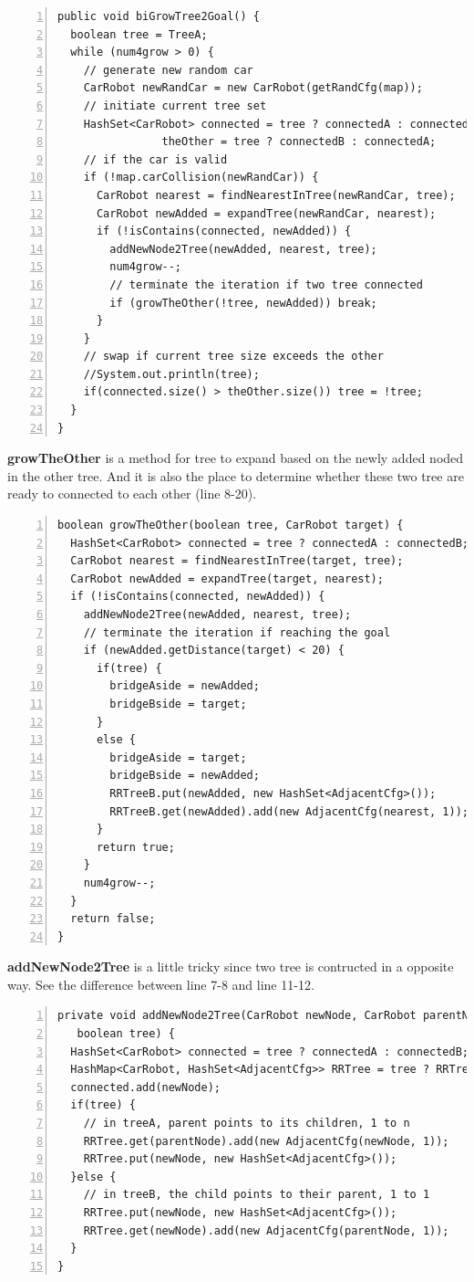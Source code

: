 \documentclass{article}
\begin{document}
\begin{lstlisting}[numbers=left]
public void biGrowTree2Goal() {
  boolean tree = TreeA;
  while (num4grow > 0) {
    // generate new random car
    CarRobot newRandCar = new CarRobot(getRandCfg(map));
    // initiate current tree set
    HashSet<CarRobot> connected = tree ? connectedA : connectedB,
                theOther = tree ? connectedB : connectedA;
    // if the car is valid
    if (!map.carCollision(newRandCar)) {
      CarRobot nearest = findNearestInTree(newRandCar, tree);
      CarRobot newAdded = expandTree(newRandCar, nearest);
      if (!isContains(connected, newAdded)) {
        addNewNode2Tree(newAdded, nearest, tree);
        num4grow--;
        // terminate the iteration if two tree connected
        if (growTheOther(!tree, newAdded)) break;
      }
    }
    // swap if current tree size exceeds the other
    //System.out.println(tree);
    if(connected.size() > theOther.size()) tree = !tree;
  }
}
\end{lstlisting}



\textbf{growTheOther} is a method for tree to expand based on the newly added noded in the other tree. And it is also the place to determine whether these two tree are ready to connected to each other (line 8-20).

\begin{lstlisting}[numbers=left]
boolean growTheOther(boolean tree, CarRobot target) {
  HashSet<CarRobot> connected = tree ? connectedA : connectedB;
  CarRobot nearest = findNearestInTree(target, tree);
  CarRobot newAdded = expandTree(target, nearest);
  if (!isContains(connected, newAdded)) {
    addNewNode2Tree(newAdded, nearest, tree);
    // terminate the iteration if reaching the goal
    if (newAdded.getDistance(target) < 20) {
      if(tree) {
        bridgeAside = newAdded;
        bridgeBside = target;
      }
      else {
        bridgeAside = target;
        bridgeBside = newAdded;
        RRTreeB.put(newAdded, new HashSet<AdjacentCfg>());
        RRTreeB.get(newAdded).add(new AdjacentCfg(nearest, 1));
      }
      return true;
    }
    num4grow--;
  }
  return false;
}
\end{lstlisting}

\textbf{addNewNode2Tree} is a little tricky since two tree is contructed in a opposite way. See the difference between line 7-8 and line 11-12.

\begin{lstlisting}[numbers=left]
private void addNewNode2Tree(CarRobot newNode, CarRobot parentNode,
   boolean tree) {
  HashSet<CarRobot> connected = tree ? connectedA : connectedB;
  HashMap<CarRobot, HashSet<AdjacentCfg>> RRTree = tree ? RRTreeA : RRTreeB;
  connected.add(newNode);
  if(tree) {
    // in treeA, parent points to its children, 1 to n
    RRTree.get(parentNode).add(new AdjacentCfg(newNode, 1));
    RRTree.put(newNode, new HashSet<AdjacentCfg>());
  }else {
    // in treeB, the child points to their parent, 1 to 1
    RRTree.put(newNode, new HashSet<AdjacentCfg>());
    RRTree.get(newNode).add(new AdjacentCfg(parentNode, 1));
  }
}
\end{lstlisting}
\end{document}

